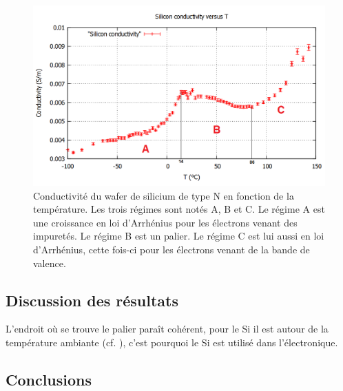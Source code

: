 \begin{figure}[hb]
  \begin{center}
		\includegraphics[width=12cm]{./images/Conductivite_Silicium_finale_english.png}
		\caption{Conductivité du wafer de silicium de type N en fonction de la température. Les trois régimes sont notés A, B et C. Le régime A est une croissance en loi d'Arrhénius pour les électrons venant des impuretés. Le régime B est un palier. Le régime C est lui aussi en loi d'Arrhénius, cette fois-ci pour les électrons venant de la bande de valence.}
		\label{courbe_silicium}
	\end{center}
\end{figure}

\subsection{Discussion des résultats}

L'endroit où se trouve le palier paraît cohérent, pour le Si il est autour de la température ambiante (cf. \cite{kittel_introduction_1976}), 
c'est pourquoi le Si est utilisé dans l'électronique.


\subsection{Conclusions}

